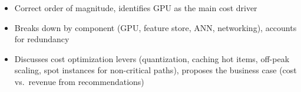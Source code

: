 \begin{interviewq}
\goodgreat
\begin{itemize}
    \item {} Correct order of magnitude, identifies GPU as the main cost driver
    \item {} Breaks down by component (GPU, feature store, ANN, networking), accounts for redundancy
    \item {} Discusses cost optimization levers (quantization, caching hot items, off-peak scaling, spot instances for non-critical paths), proposes the business case (cost vs.\ revenue from recommendations)
\end{itemize}

\end{interviewq}

